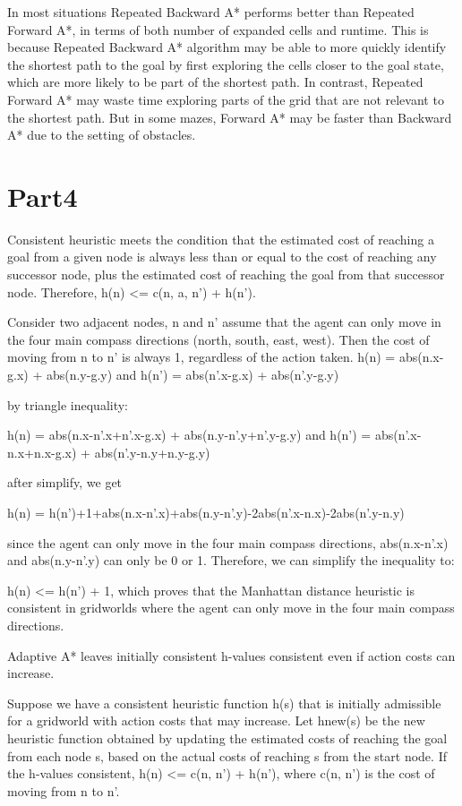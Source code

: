 \documentclass[12pt, letterpaper]{article}
\begin{document}
In most situations Repeated Backward A* performs better than Repeated Forward A*, in terms of both number of expanded cells and runtime. This is because Repeated Backward A* algorithm may be able to more quickly identify the shortest path to the goal by first exploring the cells closer to the goal state, which are more likely to be part of the shortest path. In contrast, Repeated Forward A* may waste time exploring parts of the grid that are not relevant to the shortest path. But in some mazes, Forward A* may be faster than Backward A* due to the setting of obstacles.

\section{Part4}

Consistent heuristic meets the condition that the estimated cost of reaching a goal from a given node is always less than or equal to the cost of reaching any successor node, plus the estimated cost of reaching the goal from that successor node. Therefore, h(n) <= c(n, a, n') + h(n'). 

Consider two adjacent nodes, n and n' assume that the agent can only move in the four main compass directions (north, south, east, west). Then the cost of moving from n to n' is always 1, regardless of the action taken. h(n) = abs(n.x-g.x) + abs(n.y-g.y) and h(n') = abs(n'.x-g.x) + abs(n'.y-g.y)

by triangle inequality:

h(n) = abs(n.x-n'.x+n'.x-g.x) + abs(n.y-n'.y+n'.y-g.y) and h(n') = abs(n'.x-n.x+n.x-g.x) + abs(n'.y-n.y+n.y-g.y)

after simplify, we get

h(n) = h(n')+1+abs(n.x-n'.x)+abs(n.y-n'.y)-2abs(n'.x-n.x)-2abs(n'.y-n.y)

since the agent can only move in the four main compass directions, abs(n.x-n'.x) and abs(n.y-n'.y) can only be 0 or 1. Therefore, we can simplify the inequality to:

h(n) <= h(n') + 1, which proves that the Manhattan distance heuristic is consistent in gridworlds where the agent can only move in the four main compass directions.

Adaptive A* leaves initially consistent h-values consistent even if action costs can increase.

Suppose we have a consistent heuristic function h(s) that is initially admissible for a gridworld with action costs that may increase. Let hnew(s) be the new heuristic function obtained by updating the estimated costs of reaching the goal from each node s, based on the actual costs of reaching s from the start node. If the h-values consistent, h(n) <= c(n, n') + h(n'), where c(n, n') is the cost of moving from n to n'.
\end{document}
